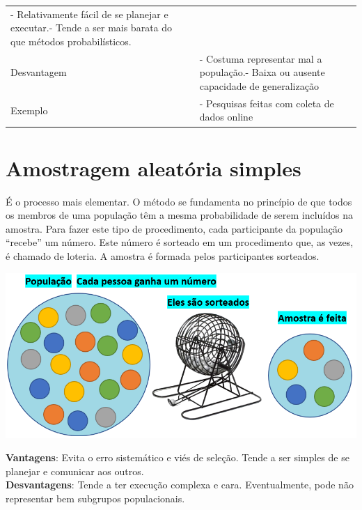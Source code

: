 \documentclass[
]{book}
\begin{document}
\begin{longtable}[]{@{}ll@{}}
\begin{minipage}[t]{0.51\columnwidth}
- Relativamente fácil de se planejar e executar.- Tende a ser mais barata do que métodos probabilísticos.\strut
\end{minipage}\tabularnewline
\begin{minipage}[t]{0.43\columnwidth}\raggedright
Desvantagem\strut
\end{minipage} & \begin{minipage}[t]{0.51\columnwidth}\raggedright
- Costuma representar mal a população.- Baixa ou ausente capacidade de generalização\strut
\end{minipage}\tabularnewline
\begin{minipage}[t]{0.43\columnwidth}\raggedright
Exemplo\strut
\end{minipage} & \begin{minipage}[t]{0.51\columnwidth}\raggedright
- Pesquisas feitas com coleta de dados online\strut
\end{minipage}\tabularnewline
\bottomrule
\end{longtable}

\hypertarget{amostragem-aleatuxf3ria-simples}{%
\section{Amostragem aleatória simples}\label{amostragem-aleatuxf3ria-simples}}

É o processo mais elementar. O método se fundamenta no princípio de que todos os membros de uma população têm a mesma probabilidade de serem incluídos na amostra. Para fazer este tipo de procedimento, cada participante da população ``recebe'' um número. Este número é sorteado em um procedimento que, as vezes, é chamado de loteria. A amostra é formada pelos participantes sorteados.

\includegraphics{./img/cap_aas.png}

\textbf{Vantagens}: Evita o erro sistemático e viés de seleção. Tende a ser simples de se planejar e comunicar aos outros.\\
\textbf{Desvantagens}: Tende a ter execução complexa e cara. Eventualmente, pode não representar bem subgrupos populacionais.
\end{document}
